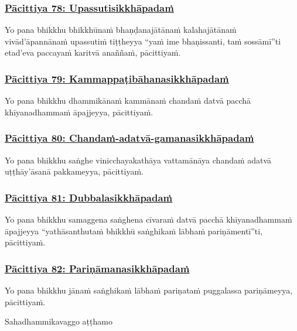 \subsubsection*{\hyperref[exp78]{Pācittiya 78: Upassutisikkhāpadaṁ}}
\label{pac78}

Yo pana bhikkhu bhikkhūnaṁ bhaṇḍanajātānaṁ kalahajātānaṁ vivād'āpannānaṁ upassutiṁ tiṭṭheyya “yaṁ ime bhaṇissanti, taṁ sossāmī”ti etad'eva paccayaṁ karitvā anaññaṁ, pācittiyaṁ.

\subsubsection*{\hyperref[exp79]{Pācittiya 79: Kammappaṭibāhanasikkhāpadaṁ}}
\label{pac79}

Yo pana bhikkhu dhammikānaṁ kammānaṁ chandaṁ datvā pacchā khīyanadhammaṁ āpajjeyya, pācittiyaṁ.

\subsubsection*{\hyperref[exp80]{Pācittiya 80: Chandaṁ-adatvā-gamanasikkhāpadaṁ}}
\label{pac80}

Yo pana bhikkhu saṅghe vinicchayakathāya vattamānāya chandaṁ adatvā uṭṭhāy'āsanā pakkameyya, pācittiyaṁ.

\subsubsection*{\hyperref[exp81]{Pācittiya 81: Dubbalasikkhāpadaṁ}}
\label{pac81}

Yo pana bhikkhu samaggena saṅghena cīvaraṁ datvā pacchā khīyanadhammaṁ āpajjeyya “yathāsanthutaṁ bhikkhū saṅghikaṁ lābhaṁ pariṇāmentī”ti, pācittiyaṁ.

\subsubsection*{\hyperref[exp82]{Pācittiya 82: Pariṇāmanasikkhāpadaṁ}}
\label{pac82}

Yo pana bhikkhu jānaṁ saṅghikaṁ lābhaṁ pariṇataṁ puggalassa pariṇāmeyya, pācittiyaṁ.

\begin{center}
  Sahadhammikavaggo aṭṭhamo
\end{center}

